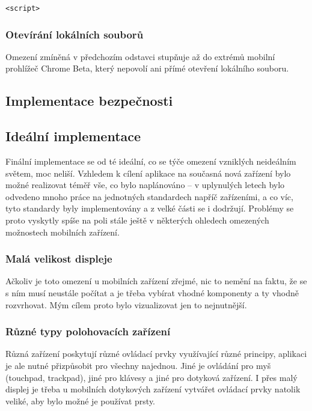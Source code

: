 \verb|<script>|


\subsubsection{Otevírání lokálních souborů}
Omezení zmíněná v předchozím odstavci stupňuje až do extrémů mobilní prohlížeč Chrome Beta, který nepovolí ani přímé otevření lokálního souboru. 

\subsection{Implementace bezpečnosti}



\subsection{Ideální implementace}
Finální implementace se od té ideální, co se týče omezení vzniklých neideálním světem, moc neliší. Vzhledem k cílení aplikace na současná nová zařízení bylo možné realizovat téměř vše, co bylo naplánováno -- v uplynulých letech bylo odvedeno mnoho práce na jednotných standardech napříč zařízeními, a co víc, tyto standardy byly implementovány a z velké části se i dodržují. Problémy se proto vyskytly spíše na poli stále ještě v některých ohledech omezených možnostech mobilních zařízení.

\subsubsection{Malá velikost displeje}
Ačkoliv je toto omezení u mobilních zařízení zřejmé, nic to nemění na faktu, že se s ním musí neustále počítat a je třeba vybírat vhodné komponenty a ty vhodně rozvrhovat. Mým cílem proto bylo vizualizovat jen to nejnutnější.

\subsubsection{Různé typy polohovacích zařízení}
Různá zařízení poskytují různé ovládací prvky využívající různé principy, aplikaci je ale nutné přizpůsobit pro všechny najednou. Jiné je ovládání pro myš (touchpad, trackpad), jiné pro klávesy a jiné pro dotyková zařízení. I přes malý displej je třeba u mobilních dotykových zařízení vytvářet ovládací prvky natolik veliké, aby bylo možné je používat prsty.

